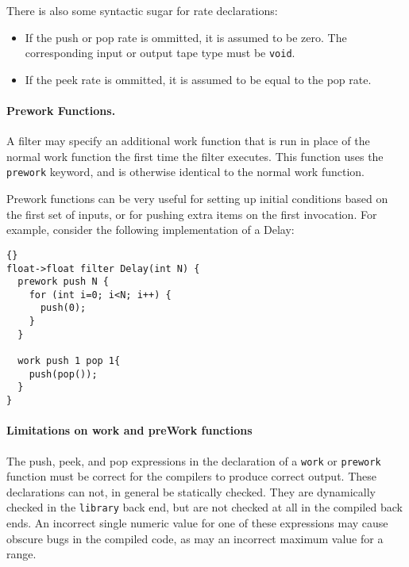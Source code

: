 \documentclass[11pt]{article}
\begin{document}
\noindent There is also some syntactic sugar for rate declarations:

\begin{itemize}

\item If the push or pop rate is ommitted, it is assumed to be zero.
The corresponding input or output tape type must be \lstinline|void|.

\item If the peek rate is ommitted, it is assumed to be equal to the
pop rate.


\end{itemize}

\paragraph{Prework Functions.}  A filter may specify an additional work 
function that is run in place of the normal work function the first
time the filter executes.  This function uses the \lstinline|prework|
keyword, and is otherwise identical to the normal work function.

Prework functions can be very useful for setting up initial conditions
based on the first set of inputs, or for pushing extra items on the
first invocation.  For example, consider the following implementation
of a Delay:

\begin{lstlisting}{}
float->float filter Delay(int N) {
  prework push N {
    for (int i=0; i<N; i++) {
      push(0);
    }
  }

  work push 1 pop 1{
    push(pop());
  }
}
\end{lstlisting}

\paragraph{Limitations on work and preWork functions}
The push, peek, and pop expressions
in the declaration of a \lstinline|work| or \lstinline|prework| function
must be correct for the compilers to produce correct output.  These
declarations can not, in general be statically checked.  They are
dynamically checked in the \lstinline|library| back end, but are not
checked at all in the compiled back ends.  An incorrect single numeric value
for one of these expressions may cause obscure bugs in the compiled
code, as may an incorrect maximum value for a range.
\end{document}
